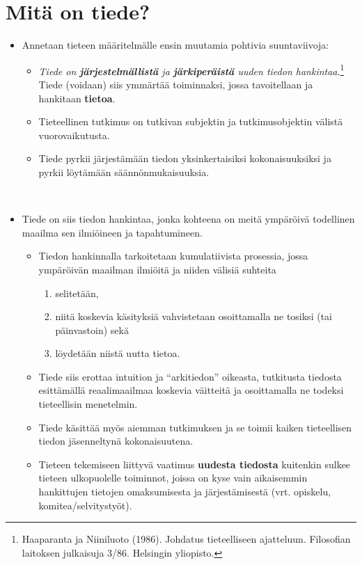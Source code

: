 \documentclass[
]{book}
\providecommand{\tightlist}{%
  \setlength{\itemsep}{0pt}\setlength{\parskip}{0pt}}
\begin{document}
\hypertarget{alaluku21}{%
\section{Mitä on tiede?}\label{alaluku21}}

\begin{itemize}
\tightlist
\item
  Annetaan tieteen määritelmälle ensin muutamia pohtivia suuntaviivoja:

  \begin{itemize}
  \tightlist
  \item
    \emph{Tiede on \textbf{järjestelmällistä} ja \textbf{järkiperäistä} uuden tiedon hankintaa}.\footnote{Haaparanta ja Niiniluoto (1986). Johdatus tieteelliseen ajatteluun. Filosofian laitoksen julkaisuja 3/86. Helsingin yliopisto.} Tiede (voidaan) siis ymmärtää toiminnaksi, jossa tavoitellaan ja hankitaan \textbf{tietoa}.
  \item
    Tieteellinen tutkimus on tutkivan subjektin ja tutkimusobjektin välistä vuorovaikutusta.
  \item
    Tiede pyrkii järjestämään tiedon yksinkertaisiksi kokonaisuuksiksi ja pyrkii löytämään säännönmukaisuuksia.\\
    \strut \\
  \end{itemize}
\item
  Tiede on siis tiedon hankintaa, jonka kohteena on meitä ympäröivä todellinen maailma sen ilmiöineen ja tapahtumineen.

  \begin{itemize}
  \tightlist
  \item
    Tiedon hankinnalla tarkoitetaan kumulatiivista prosessia, jossa ympäröivän maailman ilmiöitä ja niiden välisiä suhteita

    \begin{enumerate}
    \def\labelenumi{\roman{enumi})}
    \tightlist
    \item
      selitetään,
    \item
      niitä koskevia käsityksiä vahvistetaan osoittamalla ne tosiksi (tai päinvastoin) sekä
    \item
      löydetään niistä uutta tietoa.
    \end{enumerate}
  \item
    Tiede siis erottaa intuition ja ``arkitiedon'' oikeasta, tutkitusta tiedosta esittämällä reaalimaailmaa koskevia väitteitä ja osoittamalla ne todeksi tieteellisin menetelmin.
  \item
    Tiede käsittää myös aiemman tutkimuksen ja se toimii kaiken tieteellisen tiedon jäsenneltynä kokonaisuutena.
  \item
    Tieteen tekemiseen liittyvä vaatimus \textbf{uudesta tiedosta} kuitenkin sulkee tieteen ulkopuolelle toiminnot, joissa on kyse vain aikaisemmin hankittujen tietojen omaksumisesta ja järjestämisestä (vrt. opiskelu, komitea/selvitystyöt).


\end{itemize}
\end{itemize}
\end{document}
